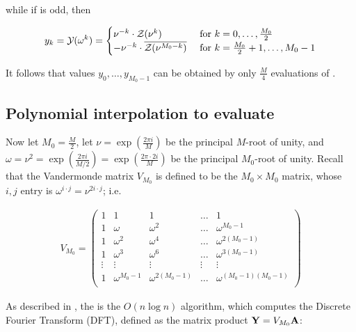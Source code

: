 while if \dBP{\strA}{\strB} is odd, then

\begin{align}
\label{eq:ffttwo:trickForRoU2}
y_k = \emYof{}{\omega^k} =
\begin{cases}
\nu^{-k} \cdot \emZof{}{\nu^k}
& \text{ for } k=0,\dots,\frac{M_0}{2} \\
-\nu^{-k} \cdot \overline{\emZof{}{\nu^{M_0-k}}}
& \text{ for } k=\frac{M_0}{2}+1,\dots,M_0-1 \\
\end{cases}
\end{align}

It follows that values $y_0,\dots,y_{M_0-1}$ can be obtained by only
$\frac{M}{4}$ evaluations of \fullZx.

\subsection{Polynomial interpolation to evaluate
\texorpdfstring{}{}}
\label{subsec:ffttwo:fft}

Now let $M_0=\frac{M}{2}$, let
$\nu=\exp(\frac{2\pi i}{M})$ be the principal $M$-root of unity, and
$\omega=\nu^2=\exp(\frac{2\pi i}{M/2})=\exp(\frac{2\pi \cdot 2i}{M})$ be
the principal $M_0$-root of unity. Recall that the
Vandermonde matrix $V_{M_0}$ is defined to be the
$M_0 \times M_0$ matrix, whose $i,j$ entry is
$\omega^{i \cdot j} = \nu^{2 i \cdot j}$;
i.e.

\begin{align}
\label{eq:ffttwo:vandermonde}
V_{M_0} = \left(
\begin{array}{rrrrr}
1 & 1 & 1 & \dots & 1 \\
1 & \omega & \omega^2 & \dots & \omega^{M_0-1} \\
1 & \omega^2 & \omega^4 & \dots & \omega^{2(M_0-1)} \\
1 & \omega^3 & \omega^6 & \dots & \omega^{3(M_0-1)} \\
\vdots & \vdots & \vdots & \vdots & \vdots \\
1 & \omega^{M_0-1} & \omega^{2(M_0-1)} & \dots & \omega^{(M_0-1)(M_0-1)} \\
\end{array}
\right)
\end{align}

As described in , the \fft is the $O(n \log n)$
algorithm, which computes the Discrete Fourier Transform (DFT), defined
as the matrix product ${\bf Y} = V_{M_0} {\bf A}$:

